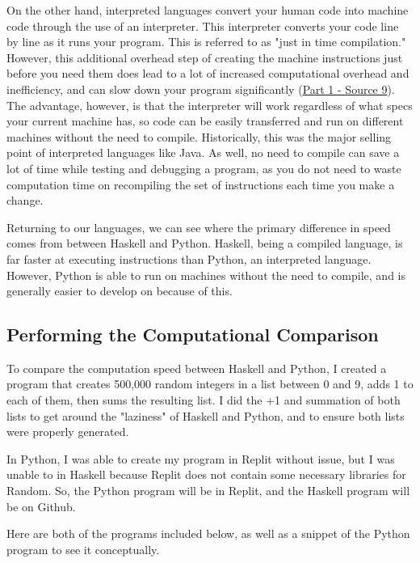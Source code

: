 \documentclass{article}
\begin{document}
    \medskip\noindent On the other hand, interpreted languages convert your human code into machine code through the use of an interpreter. This interpreter converts your code line by line as it runs your program. This is referred to as "just in time compilation." However, this additional overhead step of creating the machine instructions just before you need them does lead to a lot of increased computational overhead and inefficiency, and can slow down your program significantly (\href{https://www.freecodecamp.org/news/compiled-versus-interpreted-languages/}{Part 1 - Source 9}). The advantage, however, is that the interpreter will work regardless of what specs your current machine has, so code can be easily transferred and run on different machines without the need to compile. Historically, this was the major selling point of interpreted languages like Java. As well, no need to compile can save a lot of time while testing and debugging a program, as you do not need to waste computation time on recompiling the set of instructions each time you make a change.  
    
    \medskip\noindent Returning to our languages, we can see where the primary difference in speed comes from between Haskell and Python. Haskell, being a compiled language, is far faster at executing instructions than Python, an interpreted language. However, Python is able to run on machines without the need to compile, and is generally easier to develop on because of this. 
    

\subsection{Performing the Computational Comparison}
 To compare the computation speed between Haskell and Python, I created a program that creates 500,000 random integers in a list between 0 and 9, adds 1 to each of them, then sums the resulting list. I did the +1 and summation of both lists to get around the "laziness" of Haskell and Python, and to ensure both lists were properly generated. 
 
 \medskip\noindent In Python, I was able to create my program in Replit without issue, but I was unable to in Haskell because Replit does not contain some necessary libraries for Random. So, the Python program will be in Replit, and the Haskell program will be on Github. 
 
 \medskip\noindent Here are both of the programs included below, as well as a snippet of the Python program to see it conceptually.
 
\end{document}

